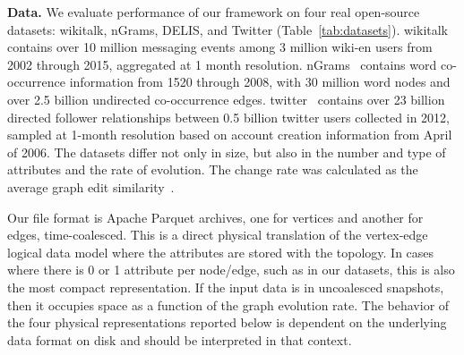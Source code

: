 {\bf Data.}  We evaluate performance of our framework on four real
open-source datasets: wikitalk, nGrams, DELIS, and Twitter
(Table~\ref{tab:datasets}).  wikitalk~\cite{wikitalk} contains over 10
million messaging events among 3 million wiki-en users from 2002
through 2015, aggregated at 1 month resolution.  nGrams~\cite{nGrams}
contains word co-occurrence information from 1520 through 2008, with
30 million word nodes and over 2.5 billion undirected co-occurrence
edges.  twitter~\cite{twitter} contains over 23 billion directed
follower relationships between 0.5 billion twitter users collected in
2012, sampled at 1-month resolution based on account creation
information from April of 2006.  The datasets differ not only in size,
but also in the number and type of attributes and the rate of
evolution.  The change rate was calculated as the average graph edit
similarity~\cite{Ren2011}.  

Our file format is Apache Parquet archives, one for vertices and
another for edges, time-coalesced.  This is a direct physical
translation of the vertex-edge \tg logical data model where the
attributes are stored with the topology.  In cases where there is 0 or
1 attribute per node/edge, such as in our datasets, this is also the
most compact representation.  If the input data is in uncoalesced
snapshots, then it occupies space as a function of the graph evolution
rate.  The behavior of the four physical representations reported
below is dependent on the underlying data format on disk and should be
interpreted in that context.

